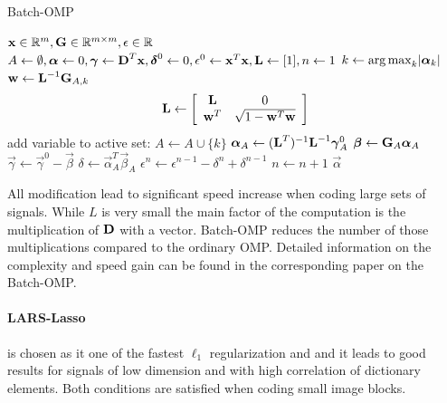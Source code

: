 \begin{algorithm}[H]
\caption{Batch-OMP}
\label{alg:batchOMP}
\begin{algorithmic}[1]
\REQUIRE $\boldsymbol{\mathrm{x}} \in \mathbb{R}^{m}, \boldsymbol{\mathrm{G}}  \in
\mathbb{R}^{m\times m}, \epsilon \in \mathbb{R}$
\STATE $A \gets \emptyset,\boldsymbol{\mathrm{\alpha}} \gets 0,\boldsymbol{\mathrm{\gamma}} \gets
\boldsymbol{\mathrm{D}}^T\boldsymbol{\mathrm{x}},\boldsymbol{\mathrm{\delta}}^0 \gets
0, \epsilon^0\gets \boldsymbol{\mathrm{x}}^T\boldsymbol{\mathrm{x}},\boldsymbol{\mathrm{L}}\gets[1],n\gets1$
\STATE $k \gets \operatorname*{arg\,max}_k\lvert \boldsymbol{\mathrm{\alpha}}_k \rvert$
\STATE $\boldsymbol{\mathrm{w}} \gets \boldsymbol{\mathrm{L}}^{-1}\boldsymbol{\mathrm{G}}_{A,k}$
\STATE
\begin{align}
\boldsymbol{\mathrm{L}} \gets \left[
\begin{array}{ccc}
\boldsymbol{\mathrm{L}} & 0\\
\boldsymbol{\mathrm{w}}^T & \sqrt{1-\boldsymbol{\mathrm{w}}^T\boldsymbol{\mathrm{w}}}
\end{array}
\right]
\end{align}
\ENDIF
\STATE add variable to active set: $A \gets A \cup \{ k\}$
\STATE $\boldsymbol{\mathrm{\alpha}}_A \gets (\boldsymbol{\mathrm{L}}^T)^{-1}\boldsymbol{\mathrm{L}}^{-1}\boldsymbol{\mathrm{\gamma}}_A^0$
\STATE $\boldsymbol{\mathrm{\beta}} \gets \boldsymbol{\mathrm{G}}_A\boldsymbol{\mathrm{\alpha}}_A$
\STATE $\vec{\gamma} \gets \vec{\gamma}^0-\vec{\beta}$
\STATE $\delta \gets \vec{\alpha}_A^T\vec{\beta}_A$
\STATE $\epsilon^n \gets \epsilon^{n-1} - \delta^n + \delta^{n-1}$
\STATE $n \gets n+1$
\ENDWHILE
\RETURN $\vec{\alpha}$
\end{algorithmic}
\end{algorithm}

All modification lead to significant speed increase when coding large sets of
signals. While $L$ is very small the main factor of the computation is
the multiplication of $\boldsymbol{\mathrm{D}}$ with a vector. Batch-OMP reduces the number of
those multiplications compared to the ordinary OMP. Detailed information on the
complexity and speed gain can be found in the corresponding
paper\cite{Rubinstein2008} on the Batch-OMP. 


\paragraph{LARS-Lasso} is chosen as it one of the fastest $\ell_1$
regularization and and it leads to good results for signals of low dimension and
with high correlation of dictionary elements.\cite{Mairal2010} Both conditions
are satisfied when coding small image blocks.

